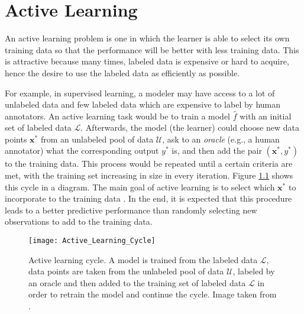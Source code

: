 
\chapter{Active Learning}
\label{ch:active_learning}



An active learning problem is one in which the learner is able to select its own training data so that the performance will be better with less training data. This is attractive because many times, labeled data is expensive or hard to acquire, hence the desire to use the labeled data as efficiently as possible.

For example, in supervised learning, a modeler may have access to a lot of unlabeled data and few labeled data which are expensive to label by human annotators. An active learning task would be to train a model $\hat{f}$ with an initial set of labeled data $\mathcal{L}$. Afterwards, the model (the learner) could choose new data points $\boldsymbol{x}^*$ from an unlabeled pool of data $\mathcal{U}$, ask to an \textit{oracle} (e.g., a human annotator) what the corresponding output $y^*$ is, and then add the pair $(\boldsymbol{x}^*, {y}^*)$ to the training data. This process would be repeated until a certain criteria are met, with the training set increasing in size in every iteration. Figure \ref{fig:Active_Learning_Cycle} shows this cycle in a diagram. The main goal of active learning is to select which $\boldsymbol{x}^*$ to incorporate to the training data \cite{cohn1996active}. In the end, it is expected that this procedure leads to a better predictive performance than randomly selecting new observations to add to the training data.

\begin{figure}[H]
    \centering
    \texttt{[image: Active\_Learning\_Cycle]}
    \caption{Active learning cycle. A model is trained from the labeled data $\mathcal{L}$, data points are taken from the unlabeled pool of data $\mathcal{U}$, labeled by an oracle and then added to the training set of labeled data $\mathcal{L}$ in order to retrain the model and continue the cycle. Image taken from \cite{settles.tr09}.}
    \label{fig:Active_Learning_Cycle}
\end{figure}

